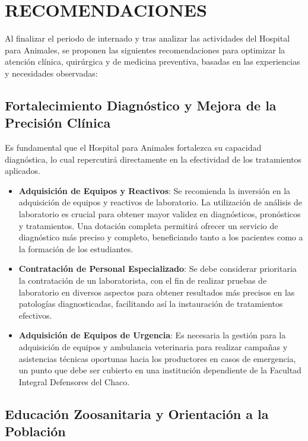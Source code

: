 \clearpage

\section{RECOMENDACIONES}

Al finalizar el periodo de internado y tras analizar las actividades del Hospital para Animales, se proponen las siguientes recomendaciones para optimizar la atención clínica, quirúrgica y de medicina preventiva, basadas en las experiencias y necesidades observadas:

\subsection{Fortalecimiento Diagnóstico y Mejora de la Precisión Clínica}

Es fundamental que el Hospital para Animales fortalezca su capacidad diagnóstica, lo cual repercutirá directamente en la efectividad de los tratamientos aplicados.

\begin{itemize}
    \item \textbf{Adquisición de Equipos y Reactivos}: Se recomienda la inversión en la adquisición de equipos y reactivos de laboratorio. La utilización de análisis de laboratorio es crucial para obtener mayor validez en diagnósticos, pronósticos y tratamientos. Una dotación completa permitirá ofrecer un servicio de diagnóstico más preciso y completo, beneficiando tanto a los pacientes como a la formación de los estudiantes.

    \item \textbf{Contratación de Personal Especializado}: Se debe considerar prioritaria la contratación de un laboratorista, con el fin de realizar pruebas de laboratorio en diversos aspectos para obtener resultados más precisos en las patologías diagnosticadas, facilitando así la instauración de tratamientos efectivos.

    \item \textbf{Adquisición de Equipos de Urgencia}: Es necesaria la gestión para la adquisición de equipos y ambulancia veterinaria para realizar campañas y asistencias técnicas oportunas hacia los productores en casos de emergencia, un punto que debe ser cubierto en una institución dependiente de la Facultad Integral Defensores del Chaco.
\end{itemize}

\subsection{Educación Zoosanitaria y Orientación a la Población}

